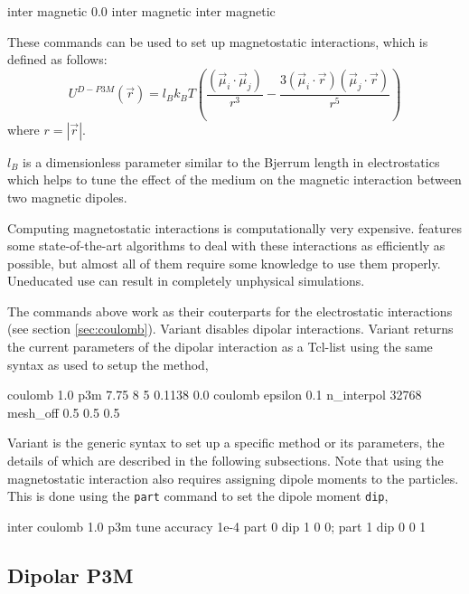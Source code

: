 \begin{essyntax}
   inter magnetic 0.0
   inter magnetic
   inter magnetic 
\end{essyntax}

These commands can be used to set up magnetostatic interactions, which
is defined as follows:
\begin{equation}
  U^{D-P3M}(\vec{r}) = l_{B} k_B T \left( \frac{(\vec{\mu}_i \cdot \vec{\mu}_j)}{r^3} 
  - \frac{3  (\vec{\mu}_i \cdot \vec{r})  (\vec{\mu}_j \cdot \vec{r}) }{r^5} \right)
\end{equation}
where $r=|\vec{r}|$.

$l_{B}$ is a dimensionless parameter similar to the Bjerrum length in
electrostatics which helps to tune the effect of the medium on the
magnetic interaction between two magnetic dipoles.

Computing magnetostatic interactions is computationally very
expensive.  \es{} features some state-of-the-art algorithms to deal
with these interactions as efficiently as possible, but almost all of
them require some knowledge to use them properly.  Uneducated use can
result in completely unphysical simulations.

The commands above work as their couterparts for the electrostatic
interactions (see section \vref{sec:coulomb}).  Variant 
disables dipolar interactions.  Variant  returns the
current parameters of the dipolar interaction as a Tcl-list using the
same syntax as used to setup the method, \eg
\begin{tclcode}
  {coulomb 1.0 p3m 7.75 8 5 0.1138 0.0}
  {coulomb epsilon 0.1 n_interpol 32768 mesh_off 0.5 0.5 0.5}
\end{tclcode}

Variant  is the generic syntax to set up a specific method
or its parameters, the details of which are described in the following
subsections.  Note that using the magnetostatic interaction also
requires assigning dipole moments to the particles.  This is done
using the \texttt{part} command to set the dipole moment \texttt{dip},
\eg
\begin{tclcode}
  inter coulomb 1.0 p3m tune accuracy 1e-4
  part 0 dip 1 0 0; part 1 dip 0 0 1
\end{tclcode}

\subsection{Dipolar P3M}

